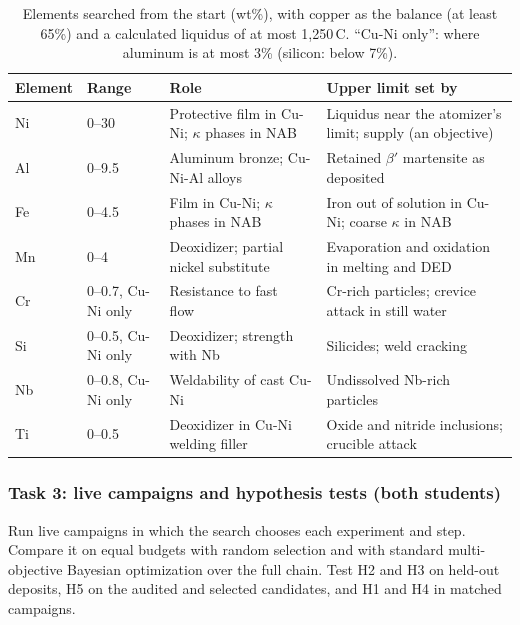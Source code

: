 \documentclass[12pt,letterpaper]{article}
\begin{document}
\begin{table}[h]
\centering
\caption{Elements searched from the start (wt\%), with copper as the balance
(at least 65\%) and a calculated liquidus of at most
1,250\,\textdegree{}C. ``Cu-Ni only'': where aluminum is at most 3\%
(silicon: below 7\%).}
\label{tab:space}
\renewcommand{\arraystretch}{1.1}
\begin{tabularx}{\textwidth}{@{}l l >{\raggedright\arraybackslash}X >{\raggedright\arraybackslash}X@{}}
\toprule
\textbf{Element} & \textbf{Range} & \textbf{Role} & \textbf{Upper limit set by} \\
\midrule
Ni & 0--30 & Protective film in Cu-Ni; $\kappa$ phases in NAB & Liquidus near
  the atomizer's limit; supply (an objective) \\
Al & 0--9.5 & Aluminum bronze; Cu-Ni-Al alloys & Retained $\beta'$
  martensite as deposited \\
Fe & 0--4.5 & Film in Cu-Ni; $\kappa$ phases in NAB & Iron out of solution in
  Cu-Ni; coarse $\kappa$ in NAB \\
Mn & 0--4 & Deoxidizer; partial nickel substitute & Evaporation and
  oxidation in melting and DED \\
Cr & 0--0.7, Cu-Ni only & Resistance to fast flow~\cite{lewis1981} & Cr-rich
  particles; crevice attack in still water \\
Si & 0--0.5, Cu-Ni only & Deoxidizer; strength with Nb & Silicides; weld
  cracking \\
Nb & 0--0.8, Cu-Ni only & Weldability of cast Cu-Ni & Undissolved Nb-rich
  particles \\
Ti & 0--0.5 & Deoxidizer in Cu-Ni welding filler~\cite{awsA57} & Oxide and
  nitride inclusions; crucible attack \\
\bottomrule
\end{tabularx}
\end{table}

\subsubsection{Task 3: live campaigns and hypothesis tests (both students)}
Run live campaigns in which the search chooses each experiment and step.
Compare it on equal budgets with random selection and with standard multi-objective Bayesian optimization over the full chain.
Test H2 and H3 on held-out deposits, H5 on the audited and selected candidates, and H1 and H4 in matched campaigns.
\end{document}
